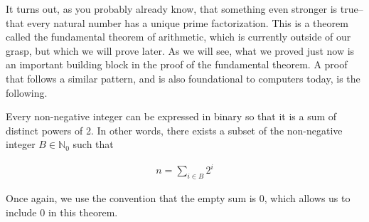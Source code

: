 It turns out, as you probably already know, that something even stronger is true--that every natural number has a unique prime factorization. This is a theorem called the fundamental theorem of arithmetic, which is currently outside of our grasp, but which we will prove later. As we will see, what we proved just now is an important building block in the proof of the fundamental theorem. A proof that follows a similar pattern, and is also foundational to computers today, is the following.

\vspace{\baselineskip}
\begin{theorem}
	Every non-negative integer can be expressed in binary so that it is a sum of distinct powers of 2. In other words, there exists a subset of the non-negative integer $B \in \mathbb{N}_0$ such that
	
	\begin{align*}
		n = \sum_{i \in B} 2^i
	\end{align*}
	
	Once again, we use the convention that the empty sum is 0, which allows us to include 0 in this theorem.
\end{theorem}

